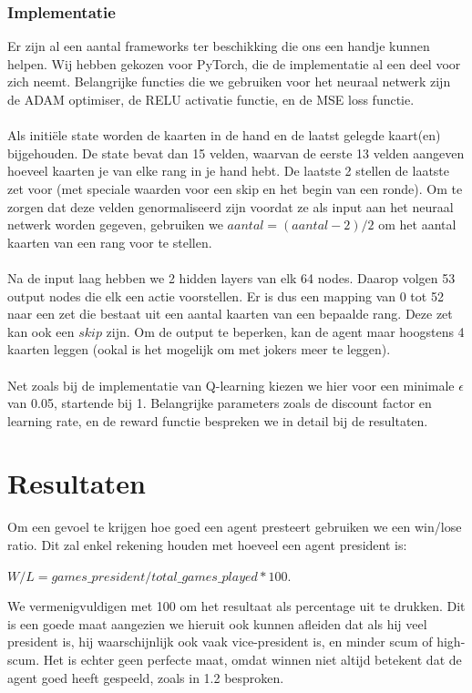 \documentclass[11pt]{article}
\begin{document}
\subsubsection{Implementatie}
Er zijn al een aantal frameworks ter beschikking die ons een handje kunnen helpen. Wij hebben gekozen voor PyTorch, die de implementatie al een deel voor zich neemt. Belangrijke functies die we gebruiken voor het neuraal netwerk zijn de ADAM optimiser, de RELU activatie functie, en de MSE loss functie.\\\\
Als initiële state worden de kaarten in de hand en de laatst gelegde kaart(en) bijgehouden. De state bevat dan 15 velden, waarvan de eerste 13 velden aangeven hoeveel kaarten je van elke rang in je hand hebt. De laatste 2 stellen de laatste zet voor (met speciale waarden voor een skip en het begin van een ronde). Om te zorgen dat deze velden genormaliseerd zijn voordat ze als input aan het neuraal netwerk worden gegeven, gebruiken we $aantal = (aantal - 2)/2$ om het aantal kaarten van een rang voor te stellen.\\\\
Na de input laag hebben we 2 hidden layers van elk 64 nodes. Daarop volgen 53 output nodes die elk een actie voorstellen. Er is dus een mapping van 0 tot 52 naar een zet die bestaat uit een aantal kaarten van een bepaalde rang. Deze zet kan ook een $skip$ zijn. Om de output te beperken, kan de agent maar hoogstens 4 kaarten leggen (ookal is het mogelijk om met jokers meer te leggen).\\\\
Net zoals bij de implementatie van Q-learning kiezen we hier voor een minimale $\epsilon$ van 0.05, startende bij 1. Belangrijke parameters zoals de discount factor en learning rate, en de reward functie bespreken we in detail bij de resultaten.

\section{Resultaten}
Om een gevoel te krijgen hoe goed een agent presteert gebruiken we een win/lose ratio. Dit zal enkel rekening houden met hoeveel een agent president is:
\begin{center}
$W/L = games\_president/total\_games\_played * 100$.
\end{center}
We vermenigvuldigen met 100 om het resultaat als percentage uit te drukken. Dit is een goede maat aangezien we hieruit ook kunnen afleiden dat als hij veel president is, hij waarschijnlijk ook vaak vice-president is, en minder scum of high-scum. Het is echter geen perfecte maat, omdat winnen niet altijd betekent dat de agent goed heeft gespeeld, zoals in 1.2 besproken.
\end{document}
